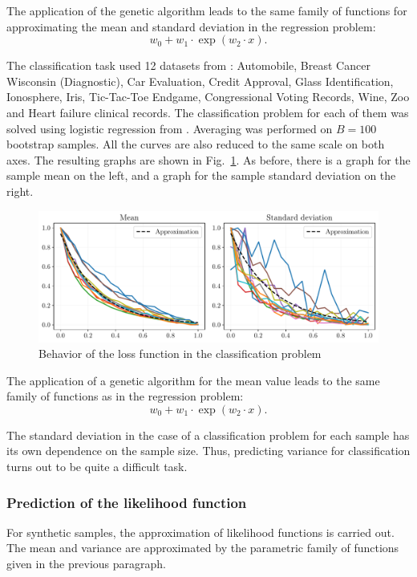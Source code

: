 \documentclass[
11pt,%
tightenlines,%
twoside,%
onecolumn,%
nofloats,%
nobibnotes,%
nofootinbib,%
superscriptaddress,%
noshowpacs,%
centertags]%
{revtex4-2}
\begin{document}
The application of the genetic algorithm leads to the same family of functions for approximating the mean and standard deviation in the regression problem:
\[ w_0 + w_1 \cdot \exp(w_2 \cdot x). \]

The classification task used 12 datasets from \citep{UCI}: Automobile, Breast Cancer Wisconsin (Diagnostic), Car Evaluation, Credit Approval, Glass Identification, Ionosphere, Iris, Tic-Tac-Toe Endgame, Congressional Voting Records, Wine, Zoo and Heart failure clinical records. The classification problem for each of them was solved using logistic regression from \citep{scikit-learn}. Averaging was performed on $B = 100$ bootstrap samples. All the curves are also reduced to the same scale on both axes. The resulting graphs are shown in Fig.~\ref{datasets_classification}. As before, there is a graph for the sample mean on the left, and a graph for the sample standard deviation on the right.

\begin{figure}[h!]
    \centering
    \includegraphics[width=\textwidth]{paper/figures/datasets_classification.pdf}
    \caption{Behavior of the loss function in the classification problem}
    \label{datasets_classification}
\end{figure}

The application of a genetic algorithm for the mean value leads to the same family of functions as in the regression problem:
\[ w_0 + w_1 \cdot \exp(w_2 \cdot x). \]

The standard deviation in the case of a classification problem for each sample has its own dependence on the sample size. Thus, predicting variance for classification turns out to be quite a difficult task.

\subsubsection{Prediction of the likelihood function}

For synthetic samples, the approximation of likelihood functions is carried out. The mean and variance are approximated by the parametric family of functions given in the previous paragraph.
\end{document}
